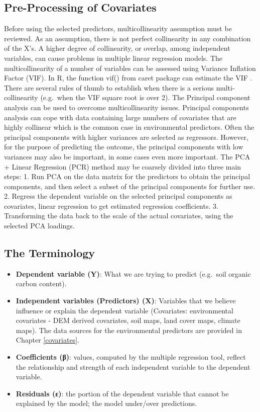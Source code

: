 \documentclass[10pt,b5paper,]{book}
\providecommand{\tightlist}{%
  \setlength{\itemsep}{0pt}\setlength{\parskip}{0pt}}
\theoremstyle{definition}
\theoremstyle{definition}
\theoremstyle{definition}
\theoremstyle{remark}
\begin{document}
\hypertarget{pre-processing-of-covariates}{%
\subsection{Pre-Processing of
Covariates}\label{pre-processing-of-covariates}}

Before using the selected predictors, multicollinearity assumption must
be reviewed. As an assumption, there is not perfect collinearity in any
combination of the X's. A higher degree of collinearity, or overlap,
among independent variables, can cause problems in multiple linear
regression models. The multicollinearity of a number of variables can be
assessed using Variance Inflation Factor (VIF). In R, the function vif()
from caret package can estimate the VIF
. There are several rules of thumb to
establish when there is a serious multi-collinearity (e.g.~when the VIF
square root is over 2). The Principal component analysis can be used to
overcome multicollinearity issues. Principal components analysis can
cope with data containing large numbers of covariates that are highly
collinear which is the common case in environmental predictors. Often
the principal components with higher variances are selected as
regressors. However, for the purpose of predicting the outcome, the
principal components with low variances may also be important, in some
cases even more important. The PCA + Linear Regression (PCR) method may
be coarsely divided into three main steps: 1. Run PCA on the data matrix
for the predictors to obtain the principal components, and then select a
subset of the principal components for further use. 2. Regress the
dependent variable on the selected principal components as covariates,
linear regression to get estimated regression coefficients. 3.
Transforming the data back to the scale of the actual covariates, using
the selected PCA loadings.

\hypertarget{the-terminology}{%
\subsection{The Terminology}\label{the-terminology}}

\begin{itemize}
\tightlist
\item
  \textbf{Dependent variable (Y)}:  What we
  are trying to predict (e.g.~soil organic carbon content).
\item
  \textbf{Independent variables (Predictors) (X)}: Variables that we
  believe influence or explain the dependent variable (Covariates:
  environmental covariates - DEM derived covariates, soil maps, land
  cover maps, climate maps). The data sources for the environmental
  predictors are provided in Chapter \ref{covariates}.
\item
  \textbf{Coefficients (β)}: values, computed by the multiple regression
  tool, reflect the relationship and strength of each independent
  variable to the dependent variable.
\item
  \textbf{Residuals (ε)}: the portion of the dependent variable that
  cannot be explained by the model; the model under/over predictions.
\end{itemize}
\end{document}
